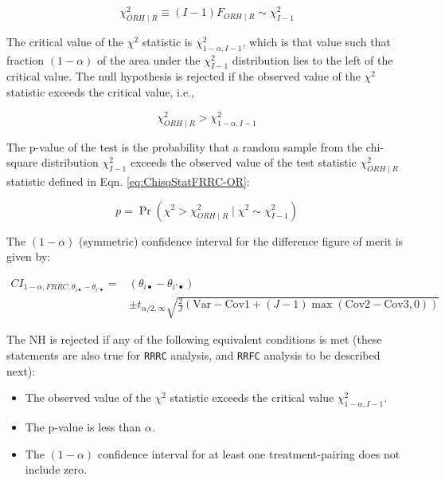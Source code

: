 \documentclass[
]{book}
\providecommand{\tightlist}{%
  \setlength{\itemsep}{0pt}\setlength{\parskip}{0pt}}
\begin{document}
\begin{equation}
\chi^2_{ORH \mid R} \equiv (I-1)F_{ORH \mid R} \sim \chi^2_{I-1}
\label{eq:ChisqStatFRRC-OR}
\end{equation}

The critical value of the \(\chi^2\) statistic is \(\chi^2_{1-\alpha,I-1}\), which is that value such that fraction \((1-\alpha)\) of the area under the \(\chi^2_{I-1}\) distribution lies to the left of the critical value. The null hypothesis is rejected if the observed value of the \(\chi^2\) statistic exceeds the critical value, i.e.,

\[\chi^2_{ORH \mid R} > \chi^2_{1-\alpha,I-1}\]

The p-value of the test is the probability that a random sample from the chi-square distribution \(\chi^2_{I-1}\) exceeds the observed value of the test statistic \(\chi^2_{ORH \mid R}\) statistic defined in Eqn. \eqref{eq:ChisqStatFRRC-OR}:

\begin{equation}
p=\Pr(\chi^2 > \chi^2_{ORH \mid R} \mid \chi^2 \sim \chi^2_{I-1})
\label{eq:pValueFRRC-OR}
\end{equation}

The \((1-\alpha)\) (symmetric) confidence interval for the difference figure of merit is given by:

\begin{equation}
\begin{split}
CI_{1-\alpha,FRRC,\theta_{i \bullet} - \theta_{i' \bullet}} =&(\theta_{i \bullet} - \theta_{i' \bullet}) \\ 
&\pm t_{\alpha/2, \infty}\sqrt{\textstyle\frac{2}{J}(\text{Var}-\text{Cov1}+(J-1)\max(\text{Cov2}-\text{Cov3},0))}
\end{split}
\label{eq:CIDiffFomFRRC-OR}
\end{equation}

The NH is rejected if any of the following equivalent conditions is met (these statements are also true for \texttt{RRRC} analysis, and \texttt{RRFC} analysis to be described next):

\begin{itemize}
\tightlist
\item
  The observed value of the \(\chi^2\) statistic exceeds the critical value \(\chi^2_{1-\alpha,I-1}\).
\item
  The p-value is less than \(\alpha\).
\item
  The \((1-\alpha)\) confidence interval for at least one treatment-pairing does not include zero.
\end{itemize}
\end{document}
